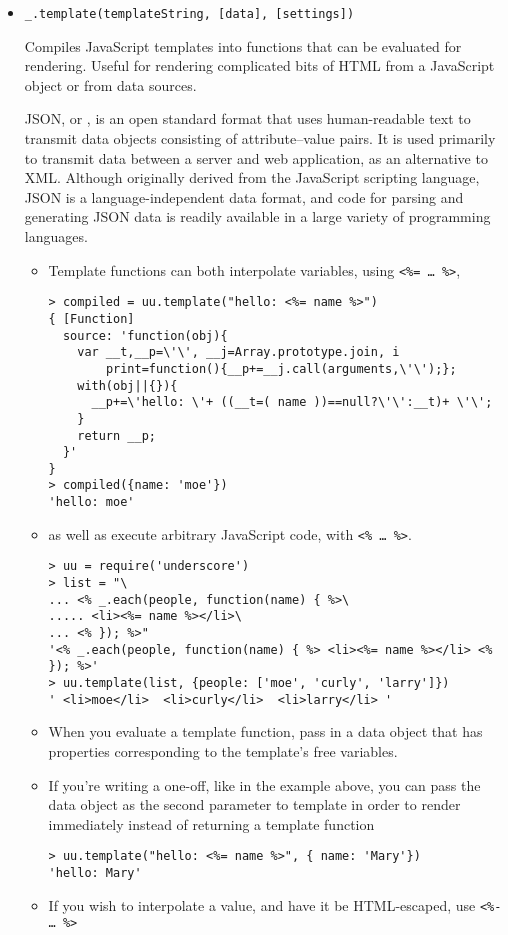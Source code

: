 \begin{itemize}
\item 
{}

\verb|_.template(templateString, [data], [settings])|

Compiles JavaScript templates into functions that can be evaluated for
rendering. Useful for rendering complicated bits of HTML from a JavaScript 
object or from  data
sources.

JSON, or , is an open standard format
that uses human-readable text to transmit data objects consisting of
attribute–value pairs. It is used primarily to transmit data between
a server and web application, as an alternative to XML.
Although originally derived from the JavaScript scripting language,
JSON is a language-independent data format, and code for parsing
and generating JSON data is readily available in a large variety of
programming languages.

\begin{itemize}
\item
Template functions can both interpolate variables, using 
\verb|<%= … %>|, 

\begin{verbatim}
> compiled = uu.template("hello: <%= name %>")
{ [Function]
  source: 'function(obj){
    var __t,__p=\'\', __j=Array.prototype.join, i
        print=function(){__p+=__j.call(arguments,\'\');};
    with(obj||{}){
      __p+=\'hello: \'+ ((__t=( name ))==null?\'\':__t)+ \'\';
    }
    return __p;
  }' 
}
> compiled({name: 'moe'})
'hello: moe'
\end{verbatim}
\item
as well as execute arbitrary JavaScript code, with 
\verb|<% … %>|. 

\begin{verbatim}
> uu = require('underscore')
> list = "\
... <% _.each(people, function(name) { %>\
..... <li><%= name %></li>\
... <% }); %>"
'<% _.each(people, function(name) { %> <li><%= name %></li> <% }); %>'
> uu.template(list, {people: ['moe', 'curly', 'larry']})
' <li>moe</li>  <li>curly</li>  <li>larry</li> '
\end{verbatim}

\item
When you evaluate a template function, pass in a data object
that has properties corresponding to the template's free variables. 

\item
If
you're writing a one-off, like in the example above, 
you can pass the data object as the second
parameter to template in order to render immediately instead of returning
a template function 
\begin{verbatim}
> uu.template("hello: <%= name %>", { name: 'Mary'})
'hello: Mary'
\end{verbatim}
\item
If
you wish to interpolate a value, and have it be HTML-escaped, use 
\verb|<%- … %>| 


\end{itemize}
\end{itemize}
